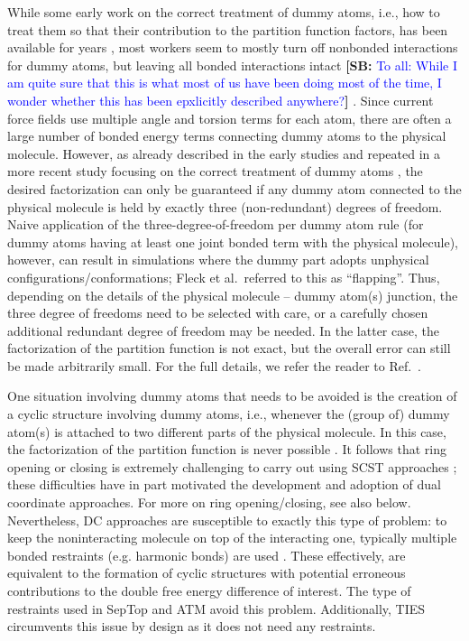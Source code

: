 \documentclass[9pt,bestpractices]{livecoms}
\newcommand{\sbnote}[1]{%
  {\bfseries{}[SB: }%
  {\textcolor{blue}{#1}}{\bfseries{}]}
}
\begin{document}
While some early work on the correct treatment of dummy atoms, i.e., how to treat them so that their contribution to the partition function factors, has been available for years \cite{Boresch_2002,Shobana_2000,Wang_2012}, most workers seem to mostly turn off nonbonded interactions for dummy atoms, but leaving all bonded interactions intact \sbnote{To all: While I am quite sure that this is what most of us have been doing most of the time, I wonder whether this has been epxlicitly described anywhere?}. Since current force fields use multiple angle and torsion terms for each atom, there are often a large number of bonded energy terms connecting dummy atoms to the physical molecule. However, as already described in the early studies and repeated in a more recent study focusing on the correct treatment of dummy atoms \cite{Fleck_2021}, the desired factorization can only be guaranteed if any dummy atom connected to the physical molecule is held by exactly three (non-redundant) degrees of freedom. Naive application of the three-degree-of-freedom per dummy atom rule (for dummy atoms having at least one joint bonded term with the physical molecule), however, can result in simulations where the dummy part adopts unphysical configurations/conformations; Fleck et al.\ referred to this as “flapping”. Thus, depending on the details of the physical molecule -- dummy atom(s) junction, the three degree of freedoms need to be selected with care, or a carefully chosen additional redundant degree of freedom may be needed. In the latter case, the factorization of the partition function is not exact, but the overall error can still be made arbitrarily small. For the full details, we refer the reader to Ref.~\cite{Fleck_2021}. 

One situation involving dummy atoms that needs to be avoided is the creation of a cyclic structure involving dummy atoms, i.e., whenever the (group of) dummy atom(s) is attached to two different parts of the physical molecule. In this case, the factorization of the partition function is never possible \cite{Shobana_2000}. It follows that ring opening or closing is extremely challenging to carry out using SCST approaches \cite{liu2015ring}; these difficulties have in part motivated the development and adoption of dual coordinate approaches. For more on ring opening/closing, see also below. Nevertheless, DC approaches are susceptible to exactly this type of problem: to keep the noninteracting molecule on top of the interacting one, typically multiple bonded restraints (e.g. harmonic bonds) are used \cite{Axelsen_1998,Ries_2022}. These effectively, are equivalent to the formation of cyclic structures with potential erroneous contributions to the double free energy difference of interest. The type of restraints used in SepTop \cite{rocklin2013separated,Baumann_2023} and ATM \cite{Azimi_2022} avoid this problem.
Additionally, TIES~\cite{bhati2017, bieniek2021} circumvents this issue by design as it does not need any restraints.
\end{document}
